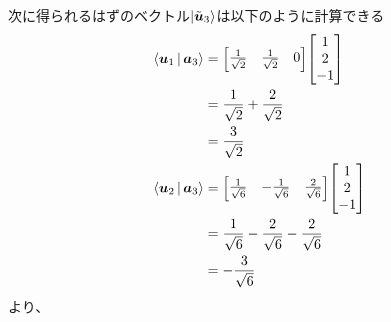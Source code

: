 \documentclass[../book_half_step_linear]{subfiles}
\begin{document}
次に得られるはずのベクトル$\ket{\tilde{\vb*{u}}_3}$は以下のように計算できる
\begin{align*}
  \Braket{\vb*{u}_1|\vb*{a}_3} & = \mqty[\frac{1}{\sqrt{2}}                                        & \frac{1}{\sqrt{2}}  & 0]              \mqty[1     \\ 2 \\ -1] \\
                               & = \dfrac{1}{\sqrt{2}} + \dfrac{2}{\sqrt{2}}                                                                           \\
                               & = \dfrac{3}{\sqrt{2}}                                                                                                 \\
  \Braket{\vb*{u}_2|\vb*{a}_3} & = \mqty[\frac{1}{\sqrt{6}}                                        & -\frac{1}{\sqrt{6}} & \frac{2}{\sqrt{6}}] \mqty[1 \\ 2 \\ -1] \\
                               & = \dfrac{1}{\sqrt{6}} - \dfrac{2}{\sqrt{6}} - \dfrac{2}{\sqrt{6}}                                                     \\
                               & = -\dfrac{3}{\sqrt{6}}
\end{align*}
より、
\end{document}
